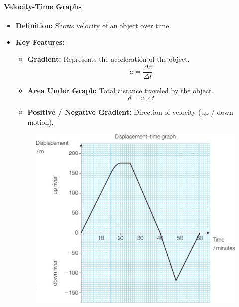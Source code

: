 \paragraph{Velocity-Time Graphs}
\begin{itemize}
    \item \textbf{Definition:} Shows velocity of an object over time.
    \item \textbf{Key Features:}
    \begin{itemize}
        \item \textbf{Gradient:} Represents the acceleration of the object.
        \begin{equation}
            a = \frac{\Delta v}{\Delta t}
        \end{equation}
        \item \textbf{Area Under Graph:} Total distance traveled by the object.
        \begin{equation}
            d = v \times t
        \end{equation}
        \item \textbf{Positive / Negative Gradient:} Direction of velocity (up / down motion).
    \end{itemize}
    \begin{figure}[H]
        \centering
        \includegraphics[scale=0.15]{Physics/1A/Images/1A-2-2.png}
    \end{figure}
\end{itemize}

